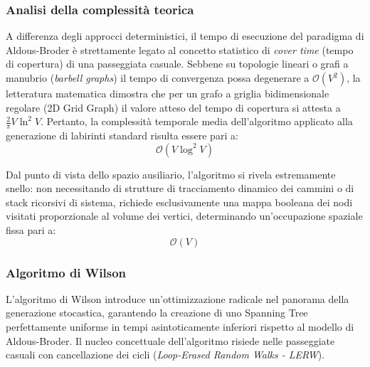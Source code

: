 \documentclass[12pt, a4paper]{article}
\begin{document}
	\subsubsection{Analisi della complessità teorica}
	A differenza degli approcci deterministici, il tempo di esecuzione del paradigma di Aldous-Broder è strettamente legato al concetto statistico di \textit{cover time} (tempo di copertura) di una passeggiata casuale. Sebbene su topologie lineari o grafi a manubrio (\textit{barbell graphs}) il tempo di convergenza possa degenerare a $\mathcal{O}(V^2)$, la letteratura matematica dimostra che per un grafo a griglia bidimensionale regolare (2D Grid Graph) il valore atteso del tempo di copertura si attesta a $\frac{2}{\pi} V \ln^2 V$. Pertanto, la complessità temporale media dell'algoritmo applicato alla generazione di labirinti standard risulta essere pari a:
	$$\mathcal{O}(V \log^2 V)$$
	
	Dal punto di vista dello spazio ausiliario, l'algoritmo si rivela estremamente snello: non necessitando di strutture di tracciamento dinamico dei cammini o di stack ricorsivi di sistema, richiede esclusivamente una mappa booleana dei nodi visitati proporzionale al volume dei vertici, determinando un'occupazione spaziale fissa pari a:
	$$\mathcal{O}(V)$$
	
	\subsubsection{Algoritmo di Wilson}
	L'algoritmo di Wilson introduce un'ottimizzazione radicale nel panorama della generazione stocastica, garantendo la creazione di uno Spanning Tree perfettamente uniforme in tempi asintoticamente inferiori rispetto al modello di Aldous-Broder. Il nucleo concettuale dell'algoritmo risiede nelle passeggiate casuali con cancellazione dei cicli (\textit{Loop-Erased Random Walks - LERW}).
	
\end{document}
